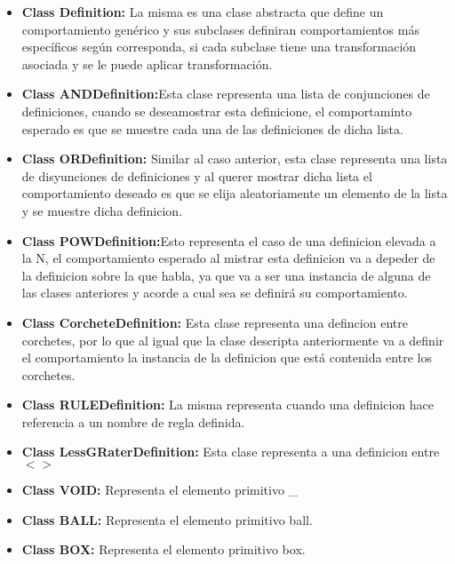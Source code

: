 \begin{itemize}

\item \textbf{Class Definition:} La misma es una clase abstracta que define un comportamiento gen\'erico y sus subclases 
definiran comportamientos m\'as espec\'ificos seg\'un corresponda, si cada subclase tiene una transformaci\'on asociada y se le puede aplicar transformaci\'on.

\item \textbf{Class ANDDefinition:}Esta clase representa una lista de conjunciones de definiciones, cuando se deseamostrar esta definicione, el comportaminto esperado es que se muestre cada una de las definiciones de dicha lista.

\item \textbf{Class ORDefinition:} Similar al caso anterior, esta clase representa una lista de disyunciones de definiciones y al querer mostrar dicha lista el comportamiento deseado es que se elija aleatoriamente un elemento de la lista y se muestre dicha definicion.

\item \textbf{Class POWDefinition:}Esto representa el caso de una definicion elevada a la N, el comportamiento esperado al mistrar esta definicion va a depeder de la definicion sobre la que habla, ya que va a ser una instancia de alguna de las clases anteriores y acorde a cual sea se definir\'a su comportamiento.

\item \textbf{Class CorcheteDefinition:} Esta clase representa una defincion entre corchetes, por lo que al igual que la clase descripta anteriormente va a definir el comportamiento la instancia de la definicion que est\'a contenida entre los corchetes.

\item \textbf{Class RULEDefinition:} La misma representa cuando una definicion hace referencia a un nombre de regla definida. 

\item \textbf{Class LessGRaterDefinition:} Esta clase representa a una definicion entre $<>$

\item \textbf{Class VOID:} Representa el elemento primitivo \_

\item \textbf{Class BALL:} Representa el elemento primitivo ball.

\item \textbf{Class BOX:}  Representa el elemento primitivo box.

\end{itemize}

